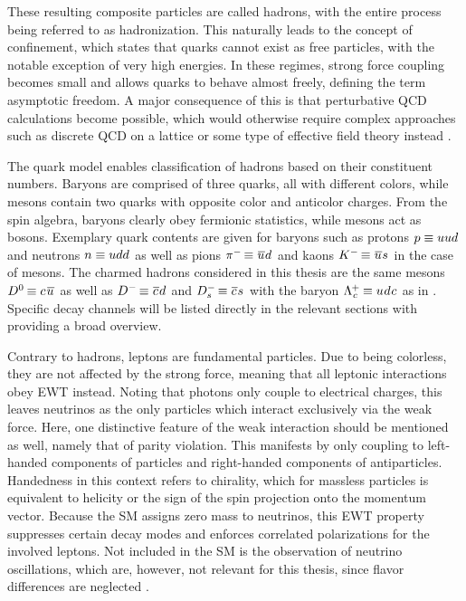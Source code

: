 These resulting composite particles are called hadrons, with the entire process being referred to as hadronization. This naturally
leads to the concept of confinement, which states that quarks cannot exist as free particles, with the notable exception of very
high energies. In these regimes, strong force coupling becomes small and allows quarks to behave almost freely, defining the term
asymptotic freedom. A major consequence of this is that perturbative QCD calculations become possible, which would otherwise
require complex approaches such as discrete QCD on a lattice or some type of effective field theory instead \cite{qwg}.

The quark model enables classification of hadrons based on their constituent numbers. Baryons are comprised of three quarks, all
with different colors, while mesons contain two quarks with opposite color and anticolor charges. From the spin algebra, baryons
clearly obey fermionic statistics, while mesons act as bosons. Exemplary quark contents are given for baryons such as protons
$p \equiv uud \kern+0.5pt$ and neutrons $n \equiv udd \kern+0.5pt$ as well as pions
$\pi^- \kern-1.0pt \equiv \kern+0.75pt \overline{\kern-0.5pt u \kern+0.5pt} d \kern+0.5pt$ and kaons
$K^- \kern-1.0pt \equiv \kern+0.75pt \overline{\kern-0.5pt u \kern+0.5pt} s \kern+0.5pt$ in the case of mesons.
The charmed hadrons considered in this thesis are the same mesons
$D^0 \kern-0.75pt \equiv c \kern+1.25pt \overline{\kern-0.5pt u \kern+0.5pt} \kern+0.5pt$ as well as
$D^- \kern-1.0pt \equiv \kern+0.5pt \overline{\kern-0.25pt c \kern+0.75pt} d \kern+0.5pt$
and $D^-_s \kern-1.0pt \equiv \kern+0.5pt \overline{\kern-0.25pt c \kern+0.75pt} s \kern+0.5pt$
with the baryon $\Lambda^{\kern-0.5pt +}_{\kern+0.5pt c} \kern-0.5pt \equiv u \kern+0.5pt d \kern+0.5pt c \kern+0.5pt$
as in \cite{Carpio_2020}. Specific decay channels will be listed directly in the relevant sections
with \cite{pdg} providing a broad overview.

Contrary to hadrons, leptons are fundamental particles. Due to being colorless, they are not affected by the strong force, meaning
that all leptonic interactions obey EWT instead. Noting that photons only couple to electrical charges, this leaves neutrinos as the
only particles which interact exclusively via the weak force. Here, one distinctive feature of the weak interaction should be
mentioned as well, namely that of parity violation. This manifests by only coupling to left-handed components of particles and
right-handed components of antiparticles. Handedness in this context refers to chirality, which for massless particles is equivalent
to helicity or the sign of the spin projection onto the momentum vector. Because the SM assigns zero mass to neutrinos, this EWT
property suppresses certain decay modes and enforces correlated polarizations for the involved leptons. Not included in the SM is
the observation of neutrino oscillations, which are, however, not relevant for this thesis, since flavor differences are neglected
\cite{Peskin_1995}.



